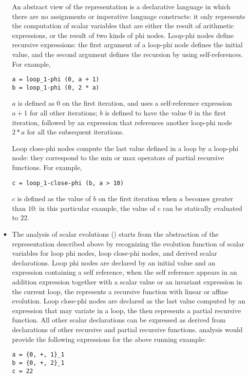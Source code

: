 \documentclass{sig-alternate}
\begin{document}
\begin{itemize}
  An abstract view of the \SSA{} representation is a declarative language
  \cite{spop2007} in which there are no assignments or imperative language
  constructs: it only represents the computation of scalar variables that are
  either the result of arithmetic expressions, or the result of two kinds of phi
  nodes.  Loop-phi nodes define recursive expressions: the first argument of a
  loop-phi node defines the initial value, and the second argument defines the
  recursion by using self-references.  For example,
  \begin{verbatim}
a = loop_1-phi (0, a + 1)
b = loop_1-phi (0, 2 * a)
  \end{verbatim}
  $a$ is defined as $0$ on the first iteration, and uses a self-reference
  expression $a+1$ for all other iterations; $b$ is defined to have the value
  $0$ in the first iteration, followed by an expression that references another
  loop-phi node $2 * a$ for all the subsequent iterations.

  Loop close-phi nodes compute the last value defined in a loop by a loop-phi
  node: they correspond to the min or max operators of partial recursive
  functions.  For example,
  \begin{verbatim}
c = loop_1-close-phi (b, a > 10)
  \end{verbatim}
  $c$ is defined as the value of $b$ on the first iteration when $a$ becomes
  greater than $10$: in this particular example, the value of $c$ can be
  statically evaluated to $22$.

\item The analysis of scalar evolutions (\scev{}) \cite{scev} starts from the
  abstraction of the \SSA{} representation described above by recognizing the
  evolution function of scalar variables for loop phi nodes, loop close-phi
  nodes, and derived scalar declarations.  Loop phi nodes are declared by an
  initial value and an expression containing a self reference, when the self
  reference appears in an addition expression together with a scalar value or an
  invariant expression in the current loop, the \scev{} represents a recursive
  function with linear or affine evolution.  Loop close-phi nodes are declared
  as the last value computed by an expression that may variate in a loop, the
  \scev{} then represents a partial recursive function.  All other scalar
  declarations can be expressed as  derived from declarations of other
  recursive and partial recursive functions.  \scev{} analysis would provide the
  following expressions for the above running example:
  \begin{verbatim}
a = {0, +, 1}_1
b = {0, +, 2}_1
c = 22
  \end{verbatim}


\end{itemize}
\end{document}
